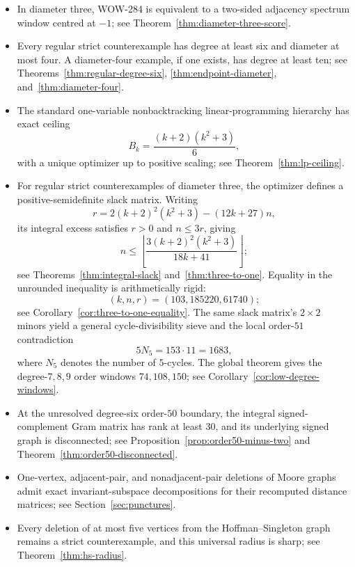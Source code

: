 \documentclass[a4paper,10pt,reqno]{amsart}
\theoremstyle{plain}
\theoremstyle{definition}
\theoremstyle{remark}
\begin{document}
\begin{itemize}
\item In diameter three, WOW-284 is equivalent to a two-sided adjacency
spectrum window centred at \(-1\); see Theorem~\ref{thm:diameter-three-score}.
\item Every regular strict counterexample has degree at least six and diameter
at most four.  A diameter-four example, if one exists, has degree at least ten;
see Theorems~\ref{thm:regular-degree-six},
\ref{thm:endpoint-diameter}, and~\ref{thm:diameter-four}.
\item The standard one-variable nonbacktracking linear-programming hierarchy
has exact ceiling
\[
 B_k=\frac{(k+2)(k^2+3)}6,
\]
with a unique optimizer up to positive scaling; see
Theorem~\ref{thm:lp-ceiling}.
\item For regular strict counterexamples of diameter three, the optimizer
defines a positive-semidefinite slack matrix.  Writing
\[
 r=2(k+2)^2(k^2+3)-(12k+27)n,
\]
its integral excess satisfies \(r>0\) and \(n\le3r\), giving
\[
 n\le\left\lfloor
 \frac{3(k+2)^2(k^2+3)}{18k+41}
 \right\rfloor;
\]
 see Theorems~\ref{thm:integral-slack} and~\ref{thm:three-to-one}.  Equality
 in the unrounded inequality is arithmetically rigid:
 \[
  (k,n,r)=(103,185220,61740);
 \]
 see Corollary~\ref{cor:three-to-one-equality}.  The same slack matrix's
\(2\times2\) minors yield a general cycle-divisibility sieve and the local
order-\(51\) contradiction
\[
 5N_5=153\cdot11=1683,
\]
where \(N_5\) denotes the number of \(5\)-cycles.  The global theorem gives
the degree-\(7,8,9\) order windows
\(74,108,150\); see Corollary~\ref{cor:low-degree-windows}.
\item At the unresolved degree-six order-\(50\) boundary, the integral
signed-complement Gram matrix has rank at least \(30\), and its underlying
signed graph is disconnected; see Proposition~\ref{prop:order50-minus-two}
and Theorem~\ref{thm:order50-disconnected}.
\item One-vertex, adjacent-pair, and nonadjacent-pair deletions of Moore graphs
admit exact invariant-subspace decompositions for their recomputed distance
matrices; see Section~\ref{sec:punctures}.
\item Every deletion of at most five vertices from the Hoffman--Singleton graph
remains a strict counterexample, and this universal radius is sharp; see
Theorem~\ref{thm:hs-radius}.
\end{itemize}
\end{document}
